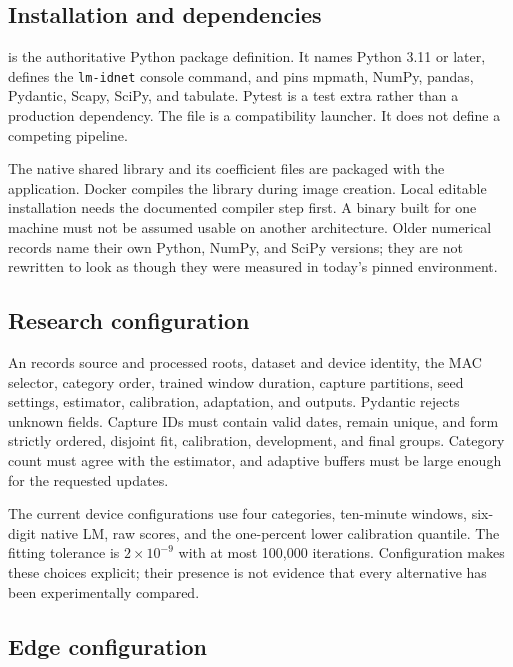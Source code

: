 \subsection{Installation and dependencies}

 is the authoritative Python package definition. It names
Python 3.11 or later, defines the \texttt{lm-idnet} console command, and pins
mpmath, NumPy, pandas, Pydantic, Scapy, SciPy, and tabulate. Pytest is a test
extra rather than a production dependency. The  file is a
compatibility launcher. It does not define a competing pipeline.



The native shared library and its coefficient files are packaged with the
application. Docker compiles the library during image creation. Local editable
installation needs the documented compiler step first. A binary built for one
machine must not be assumed usable on another architecture. Older numerical
records name their own Python, NumPy, and SciPy versions; they are not rewritten
to look as though they were measured in today's pinned environment.

\subsection{Research configuration}

An  records source and processed roots, dataset and device
identity, the MAC selector, category order, trained window duration, capture
partitions, seed settings, estimator, calibration, adaptation, and outputs.
Pydantic rejects unknown fields. Capture IDs must contain valid dates, remain
unique, and form strictly ordered, disjoint fit, calibration, development, and
final groups. Category count must agree with the estimator, and adaptive buffers
must be large enough for the requested updates.

The current device configurations use four categories, ten-minute windows,
six-digit native LM, raw scores, and the one-percent lower calibration quantile.
The fitting tolerance is $2\times10^{-9}$ with at most 100,000 iterations.
Configuration makes these choices explicit; their presence is not evidence
that every alternative has been experimentally compared.

\subsection{Edge configuration}

